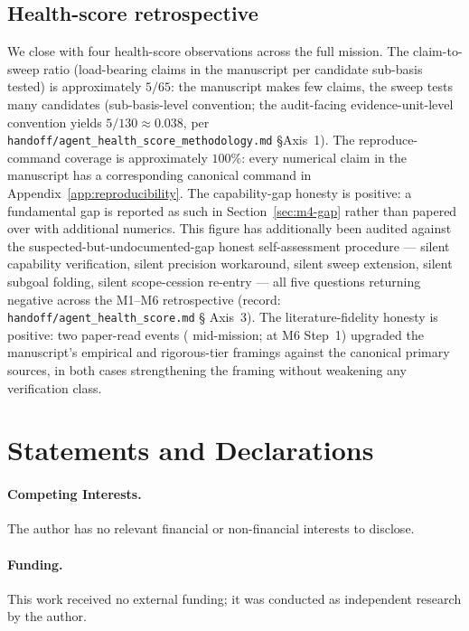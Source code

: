 \documentclass[11pt,a4paper]{article}
\begin{document}
\subsection{Health-score retrospective}\label{sec:aeal-health}

We close with four health-score observations across the full mission.
The claim-to-sweep ratio (load-bearing claims in the manuscript per
candidate sub-basis tested) is approximately $5/65$: the manuscript
makes few claims, the sweep tests many candidates
(sub-basis-level convention; the audit-facing evidence-unit-level
convention yields $5/130 \approx 0.038$, per
\texttt{handoff/agent\_health\_score\_methodology.md} \S Axis~1).
The reproduce-command coverage is approximately $100\%$: every numerical
claim in the manuscript has a corresponding canonical command in
Appendix~\ref{app:reproducibility}.
The capability-gap honesty is positive: a fundamental gap is reported as
such in Section~\ref{sec:m4-gap} rather than papered over with additional
numerics.
This figure has additionally been audited against the
suspected-but-undocumented-gap honest self-assessment procedure ---
silent capability verification, silent precision workaround, silent
sweep extension, silent subgoal folding, silent scope-cession re-entry
--- all five questions returning negative across the M1--M6
retrospective (record: \texttt{handoff/agent\_health\_score.md} \S
Axis~3).
The literature-fidelity honesty is positive: two paper-read events
(\cite{fba1999} mid-mission; \cite{bailey1998} at M6 Step~1) upgraded the
manuscript's empirical and rigorous-tier framings against the
canonical primary sources, in both cases strengthening the framing without
weakening any verification class.

\section*{Statements and Declarations}\label{sec:declarations}

\paragraph{Competing Interests.} The author has no relevant financial or
non-financial interests to disclose.

\paragraph{Funding.} This work received no external funding; it was
conducted as independent research by the author.
\end{document}
